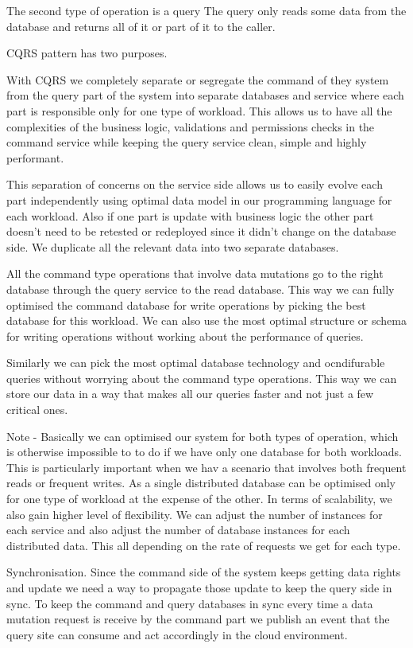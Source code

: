 \documentclass[a4paper, 11pt]{book}
\begin{document}
    The second type of operation is a query
    The query only reads some data from the database and returns all of it or part of it to the caller.

    CQRS pattern has two purposes.

    With CQRS we completely separate or segregate the command of they system from the query part of the system into separate databases and service where each part is responsible only for one type of workload.
    This allows us to have all the complexities of the business logic, validations and permissions checks in the command service while keeping the query service clean, simple and highly performant.

    This separation of concerns on the service side allows us to easily evolve each part independently using optimal data model in our programming language for each workload.
    Also if one part is update with business logic the other part doesn't need to be retested or redeployed since it didn't change on the database side.
    We duplicate all the relevant data into two separate databases.

    All the command type operations that involve data mutations go to the right database through the query service to the read database.
    This way we can fully optimised the command database for write operations by picking the best database for this workload.
    We can also use the most optimal structure or schema for writing operations without working about the performance of queries.

    Similarly we can pick the most optimal database technology and ocndifurable queries without worrying about the command type operations.
    This way we can store our data in a way that makes all our queries faster and not just a few critical ones.

    Note - Basically we can optimised our system for both types of operation, which is otherwise impossible to to do if we have only one database for both workloads.
    This is particularly important when we hav a scenario that involves both frequent reads or frequent writes.
    As a single distributed database can be optimised only for one type of workload at the expense of the other.
    In terms of scalability, we also gain higher level of flexibility.
    We can adjust the number of instances for each service and also adjust the number of database instances for each distributed data.
    This all depending on the rate of requests we get for each type.

    Synchronisation.
    Since the command side of the system keeps getting data rights and update we need a way to propagate those update to keep the query side in sync.
    To keep the command and query databases in sync every time a data mutation request is receive by the command part we publish an event that the query site can consume and act accordingly in the cloud environment.
\end{document}
